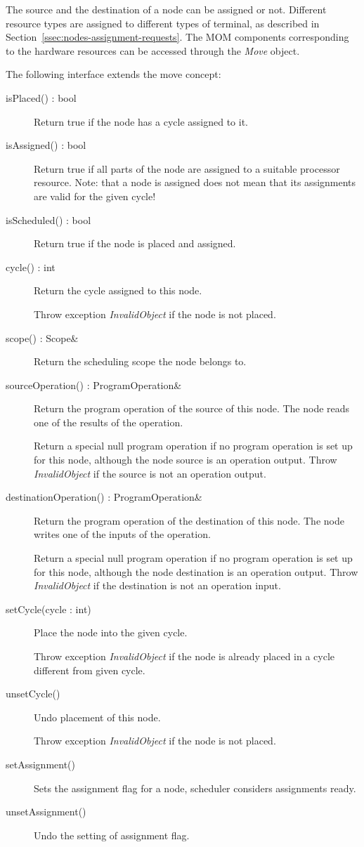 \documentclass[a4paper,twoside]{tce}
\begin{document}
The source and the destination of a node can be assigned or not. Different
resource types are assigned to different types of terminal, as described in
Section~\ref{ssec:nodes-assignment-requests}. The MOM components
corresponding to the hardware resources can be accessed through the
\emph{Move} object.

The following interface extends the move concept:
\begin{description}
\item[isPlaced() : bool]%
  Return true if the node has a cycle assigned to it.
\item[isAssigned() : bool]%
  Return true if all parts of the node are assigned to a suitable processor
  resource. Note: that a node is assigned does not mean that its
  assignments are valid for the given cycle!
\item[isScheduled() : bool]%
  Return true if the node is placed and assigned.
\item[cycle() : int]%
  Return the cycle assigned to this node.

  Throw exception \emph{InvalidObject} if the node is not placed.
\item[scope() : Scope\&]%
  Return the scheduling scope the node belongs to.
\item[sourceOperation() : ProgramOperation\&]%
  Return the program operation of the source of this node. The node reads
  one of the results of the operation.

  Return a special null program operation if no program operation is set up
  for this node, although the node source is an operation output.
%
  Throw \emph{InvalidObject} if the source is not an operation output.

\item[destinationOperation() : ProgramOperation\&]%
  Return the program operation of the destination of this node. The node
  writes one of the inputs of the operation.

  Return a special null program operation if no program operation is set up
  for this node, although the node destination is an operation output.
%
  Throw \emph{InvalidObject} if the destination is not an operation input.

\item[setCycle(cycle : int)]%
  Place the node into the given cycle.

  Throw exception \emph{InvalidObject} if the node is already placed in a
  cycle different from given cycle.

\item[unsetCycle()]%
  Undo placement of this node.

  Throw exception \emph{InvalidObject} if the node is not placed.
\item[setAssignment()]%
  Sets the assignment flag for a node, scheduler considers assignments ready.

\item[unsetAssignment()]%
  Undo the setting of assignment flag.

\end{description}
\end{document}
